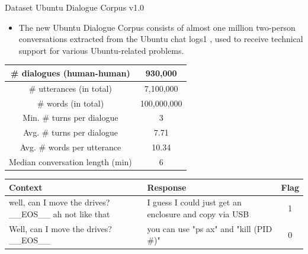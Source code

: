 \documentclass{beamer}
\begin{document}
\begin{frame}{Dataset Ubuntu Dialogue Corpus v1.0}
    \begin{itemize}
        \item The new Ubuntu Dialogue Corpus consists of
almost one million two-person conversations extracted from the Ubuntu chat logs1
, used to receive
technical support for various Ubuntu-related problems.

    \end{itemize}
    \begin{center} \tiny
        \begin{tabular}{|c|c|}
\hline # dialogues (human-human) & 930,000 \\
\hline # utterances (in total) & 7,100,000 \\
\hline # words (in total) & 100,000,000 \\
\hline Min. # turns per dialogue & 3 \\
\hline Avg. # turns per dialogue & 7.71 \\
\hline Avg. # words per utterance & 10.34 \\
\hline Median conversation length (min) & 6 \\
\hline
\end{tabular}

\begin{tabular}{|l|l|c|}
\hline Context & Response & Flag \\
\hline well, can I move the drives? \_\_EOS\_\_ ah not like that & I guess I could just get an enclosure and copy via USB & 1 \\
\hline Well, can I move the drives? \_\_EOS\_\_ & you can use "ps ax" and "kill (PID #)" & 0 \\
\hline
\end{tabular}
    \end{center}

\end{frame}
\end{document}
